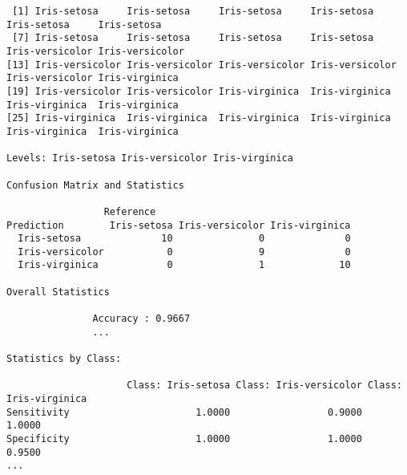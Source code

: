 \documentclass{article}
\begin{document}
\begin{lstlisting}
 [1] Iris-setosa     Iris-setosa     Iris-setosa     Iris-setosa     Iris-setosa     Iris-setosa    
 [7] Iris-setosa     Iris-setosa     Iris-setosa     Iris-setosa     Iris-versicolor Iris-versicolor
[13] Iris-versicolor Iris-versicolor Iris-versicolor Iris-versicolor Iris-versicolor Iris-virginica 
[19] Iris-versicolor Iris-versicolor Iris-virginica  Iris-virginica  Iris-virginica  Iris-virginica 
[25] Iris-virginica  Iris-virginica  Iris-virginica  Iris-virginica  Iris-virginica  Iris-virginica 

Levels: Iris-setosa Iris-versicolor Iris-virginica

Confusion Matrix and Statistics

                 Reference
Prediction        Iris-setosa Iris-versicolor Iris-virginica
  Iris-setosa              10               0              0
  Iris-versicolor           0               9              0
  Iris-virginica            0               1             10

Overall Statistics
                                          
               Accuracy : 0.9667          
               ...            

Statistics by Class:

                     Class: Iris-setosa Class: Iris-versicolor Class: Iris-virginica
Sensitivity                      1.0000                 0.9000                1.0000
Specificity                      1.0000                 1.0000                0.9500
...

\end{lstlisting}
\end{document}
